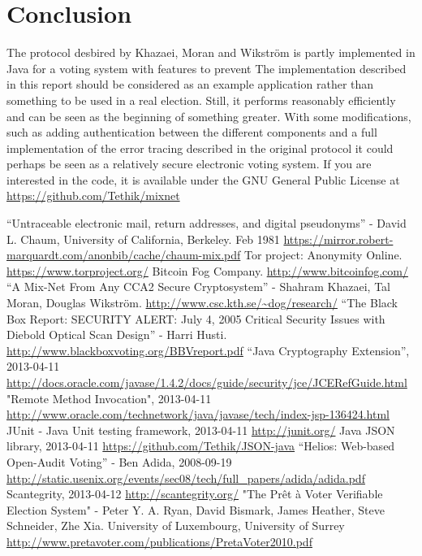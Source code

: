 \documentclass[a4paper,11pt]{kth-mag}
\begin{document}
\chapter{Conclusion}
The protocol desbired by Khazaei, Moran and Wikström is partly implemented in Java for a voting system with features to prevent  The implementation described in this report should be considered as an example application rather than something to be used in a real election. 
Still, it performs reasonably efficiently and can be seen as the beginning of something greater. With some modifications, such as adding authentication between the different components and a full implementation of the error tracing described in the original protocol it could perhaps be seen as a relatively secure electronic voting system. 
If you are interested in the code, it is available under the GNU General Public License at \url{https://github.com/Tethik/mixnet}

\begin{thebibliography}{12}
 “Untraceable electronic mail, return addresses, and digital pseudonyms” - David L. Chaum, University of California, Berkeley. Feb 1981
 \url{https://mirror.robert-marquardt.com/anonbib/cache/chaum-mix.pdf}
Tor project: Anonymity Online. 
\url{ https://www.torproject.org/}
 Bitcoin Fog Company.
 \url{http://www.bitcoinfog.com/}
 “A Mix-Net From Any CCA2 Secure Cryptosystem” - Shahram Khazaei, Tal Moran, Douglas Wikström.
 \url {http://www.csc.kth.se/~dog/research/}
 “The Black Box Report: SECURITY ALERT: July 4, 2005 Critical Security Issues with Diebold Optical Scan Design” - Harri Husti.
 \url{http://www.blackboxvoting.org/BBVreport.pdf}
“Java Cryptography Extension”, 2013-04-11
 \url{http://docs.oracle.com/javase/1.4.2/docs/guide/security/jce/JCERefGuide.html}
"Remote Method Invocation", 2013-04-11 
\url{http://www.oracle.com/technetwork/java/javase/tech/index-jsp-136424.html}
 JUnit - Java Unit testing framework, 2013-04-11 
\url{http://junit.org/}
Java JSON library, 2013-04-11 
\url{https://github.com/Tethik/JSON-java}
“Helios: Web-based Open-Audit Voting” -  Ben Adida, 2008-09-19 
\url{http://static.usenix.org/events/sec08/tech/full_papers/adida/adida.pdf}
 Scantegrity,  2013-04-12
\url{http://scantegrity.org/}
"The Prêt à Voter Verifiable Election System" - Peter Y. A. Ryan, David Bismark, James Heather, Steve Schneider, Zhe Xia. University of Luxembourg, University of Surrey 
\url{http://www.pretavoter.com/publications/PretaVoter2010.pdf}
\end{thebibliography}



\end{document}

